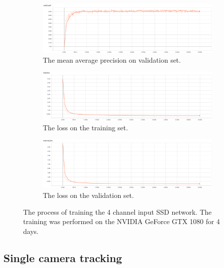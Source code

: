 \documentclass[a4paper,11pt,titlepage,twoside]{article}
\numberwithin{figure}{section}
\begin{document}
\begin{figure}[H]
    \begin{subfigure}[Sample1]{1\linewidth} 
    	\includegraphics[width=0.95\linewidth]{fig/ssd_rgbd/mAP.png}
        \caption{The mean average precision on validation set.}   
        \label{fig:ssd_mAP}
    \end{subfigure}
    \begin{subfigure}[Sample1]{1\linewidth} 
    	\includegraphics[width=0.95\linewidth]{fig/ssd_rgbd/loss.png}
        \caption{The loss on the training set.}   
        \label{fig:ssd_loss}
    \end{subfigure}    
	\begin{subfigure}[Sample1]{1\linewidth} 
    	\includegraphics[width=0.95\linewidth]{fig/ssd_rgbd/val_loss.png}
        \caption{The loss on the validation set.}   
        \label{fig:ssd_val_loss}
    \end{subfigure}    
    \caption{The process of training the 4 channel input SSD network. The training was performed on the NVIDIA GeForce GTX 1080 for 4 days.}
    \label{fig:ssd_training}
\end{figure}




\subsection{Single camera tracking}
\end{document}
